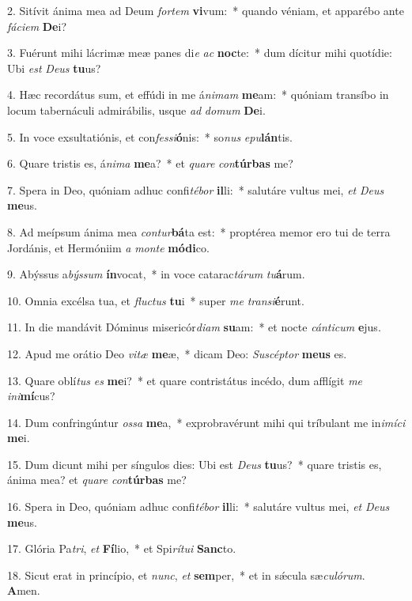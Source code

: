 2. Sitívit ánima mea ad Deum \textit{for}\textit{tem} \textbf{vi}vum:~*  quando véniam, et apparébo ante \textit{fá}\textit{ci}\textit{em} \textbf{De}i?\

3. Fuérunt mihi lácrimæ meæ panes di\textit{e} \textit{ac} \textbf{noc}te:~*  dum dícitur mihi quotídie: Ubi \textit{est} \textit{De}\textit{us} \textbf{tu}us?\

4. Hæc recordátus sum, et effúdi in me á\textit{ni}\textit{mam} \textbf{me}am:~*  quóniam transíbo in locum tabernáculi admirábilis, usque \textit{ad} \textit{do}\textit{mum} \textbf{De}i.\

5. In voce exsultatiónis, et con\textit{fes}\textit{si}\textbf{ó}nis:~*  so\textit{nus} \textit{e}\textit{pu}\textbf{lán}tis.\

6. Quare tristis es, á\textit{ni}\textit{ma} \textbf{me}a?~*  et \textit{qua}\textit{re} \textit{con}\textbf{túr}\textbf{bas} me?\

7. Spera in Deo, quóniam adhuc confi\textit{té}\textit{bor} \textbf{il}li:~*  salutáre vultus mei, \textit{et} \textit{De}\textit{us} \textbf{me}us.\

8. Ad meípsum ánima mea \textit{con}\textit{tur}\textbf{bá}ta est:~*  proptérea memor ero tui de terra Jordánis, et Hermóniim \textit{a} \textit{mon}\textit{te} \textbf{mó}\textbf{di}co.\

9. Abýssus a\textit{býs}\textit{sum} \textbf{ín}vocat,~*  in voce catarac\textit{tá}\textit{rum} \textit{tu}\textbf{á}rum.\

10. Omnia excélsa tua, et \textit{fluc}\textit{tus} \textbf{tu}i~*  super \textit{me} \textit{trans}\textit{i}\textbf{é}runt.\

11. In die mandávit Dóminus misericór\textit{di}\textit{am} \textbf{su}am:~*  et nocte \textit{cán}\textit{ti}\textit{cum} \textbf{e}jus.\

12. Apud me orátio Deo \textit{vi}\textit{tæ} \textbf{me}æ,~*  dicam Deo: \textit{Su}\textit{scép}\textit{tor} \textbf{me}\textbf{us} es.\

13. Quare oblí\textit{tus} \textit{es} \textbf{me}i?~*  et quare contristátus incédo, dum afflígit \textit{me} \textit{in}\textit{i}\textbf{mí}cus?\

14. Dum confringúntur \textit{os}\textit{sa} \textbf{me}a,~*  exprobravérunt mihi qui tríbulant me in\textit{i}\textit{mí}\textit{ci} \textbf{me}i.\

15. Dum dicunt mihi per síngulos dies: Ubi est \textit{De}\textit{us} \textbf{tu}us?~*  quare tristis es, ánima mea? et \textit{qua}\textit{re} \textit{con}\textbf{túr}\textbf{bas} me?\

16. Spera in Deo, quóniam adhuc confi\textit{té}\textit{bor} \textbf{il}li:~*  salutáre vultus mei, \textit{et} \textit{De}\textit{us} \textbf{me}us.\

17. Glória Pa\textit{tri}, \textit{et} \textbf{Fí}lio,~*  et Spi\textit{rí}\textit{tu}\textit{i} \textbf{Sanc}to.\

18. Sicut erat in princípio, et \textit{nunc}, \textit{et} \textbf{sem}per,~*  et in sǽcula sæ\textit{cu}\textit{ló}\textit{rum}. \textbf{A}men.\


